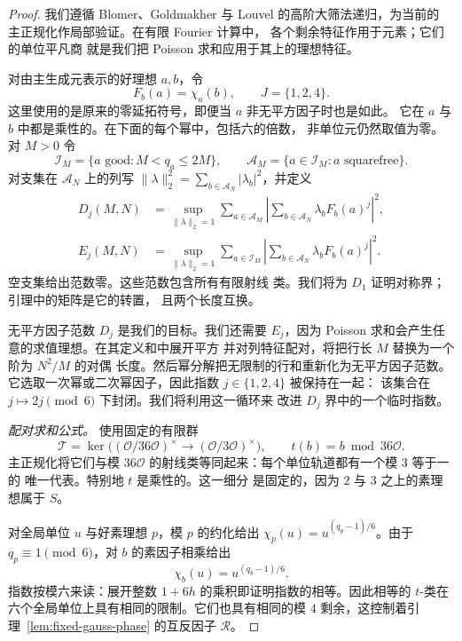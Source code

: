 \documentclass[11pt,a4paper]{article}
\numberwithin{equation}{section}
\numberwithin{figure}{section}
\theoremstyle{definition}
\theoremstyle{remark}
\begin{document}
\begin{proof}
我们遵循 Blomer、Goldmakher 与
Louvel \cite[第~3 节]{BGL} 的高阶大筛法递归，为当前的
主正规化作局部验证。在有限 Fourier 计算中，
各个剩余特征作用于元素；它们的单位平凡商
就是我们把 Poisson 求和应用于其上的理想特征。

对由主生成元表示的好理想 $a,b$，令
\[
 F_b(a)=\chi_a(b),\qquad J=\{1,2,4\}.
\]
这里使用的是原来的零延拓符号，即便当 $a$ 非无平方因子时也是如此。
它在 $a$ 与 $b$ 中都是乘性的。在下面的每个幂中，包括六的倍数，
非单位元仍然取值为零。
对 $M>0$ 令
\[
 \mathcal I_M=\{a\text{ good}:M<q_a\le2M\},\qquad
 \mathcal A_M=\{a\in\mathcal I_M:a\text{ squarefree}\}.
\]
对支集在 $\mathcal A_N$ 上的列写
$\|\lambda\|_2^2=\sum_{b\in\mathcal A_N}|\lambda_b|^2$，并定义
\begin{align*}
 D_j(M,N)&=\sup_{\|\lambda\|_2=1}
  \sum_{a\in\mathcal A_M}
  \left|\sum_{b\in\mathcal A_N}\lambda_bF_b(a)^j\right|^2,\\
 E_j(M,N)&=\sup_{\|\lambda\|_2=1}
  \sum_{a\in\mathcal I_M}
  \left|\sum_{b\in\mathcal A_N}\lambda_bF_b(a)^j\right|^2.
\end{align*}
空支集给出范数零。这些范数包含所有有限射线
类。我们将为 $D_1$ 证明对称界；引理中的矩阵是它的转置，
且两个长度互换。

无平方因子范数 $D_j$ 是我们的目标。我们还需要 $E_j$，因为
Poisson 求和会产生任意的求值理想。在其定义和中展开平方
并对列特征配对，将把行长 $M$ 替换为一个阶为 $N^2/M$ 的对偶
长度。然后幂分解把无限制的行和重新化为无平方因子范数。
它选取一次幂或二次幂因子，因此指数 $j\in\{1,2,4\}$ 被保持在一起：
该集合在 $j\mapsto2j\pmod6$ 下封闭。我们将利用这一循环来
改进 $D_j$ 界中的一个临时指数。

\medskip\noindent\emph{配对求和公式。}
使用固定的有限群
\[
 \mathcal T=\ker\bigl((\mathcal O/36\mathcal O)^\times
              \longrightarrow(\mathcal O/3\mathcal O)^\times\bigr),
 \qquad t(b)=b\bmod36\mathcal O.
\]
主正规化将它们与模
$36\mathcal O$ 的射线类等同起来：每个单位轨道都有一个模 $3$ 等于一的
唯一代表。特别地 $t$ 是乘性的。这一细分
是固定的，因为 $2$ 与 $3$ 之上的素理想属于 $S$。

对全局单位 $u$ 与好素理想 $p$，模 $p$ 的约化给出
$\chi_p(u)=u^{(q_p-1)/6}$。由于 $q_p\equiv1\pmod6$，对
$b$ 的素因子相乘给出
\begin{equation}\label{eq:sextic-sieve-unit-class}
 \chi_b(u)=u^{(q_b-1)/6}.
\end{equation}
指数按模六来读：展开整数
$1+6h$ 的乘积即证明指数的相等。因此相等的 $t$-类在
六个全局单位上具有相同的限制。它们也具有相同的模
$4$ 剩余，这控制着引理~\ref{lem:fixed-gauss-phase} 的互反因子
$\mathcal R$。


\end{proof}
\end{document}
